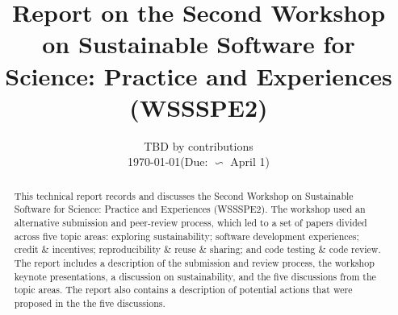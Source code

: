 \documentclass[11pt, oneside]{amsart}
\begin{document}
\title[]{Report on the Second Workshop on Sustainable Software for Science: Practice and Experiences (WSSSPE2)} 

\author{TBD by contributions \\{\scriptsize\today \quad  (Due:  $\backsim$ April 1)}}
%
%
%
%  
%
%
%
%
%
%
%


       
\begin{abstract}      
This technical report records and discusses the Second Workshop on Sustainable Software for
Science: Practice and Experiences (WSSSPE2).  The workshop used an alternative submission
and peer-review process, which led to a set of papers divided across five topic areas:
exploring sustainability;
software development experiences;
credit \& incentives;
reproducibility \& reuse \& sharing; and
code testing \& code review.
The report includes a description of the submission and review process, the workshop
keynote presentations,
a discussion on sustainability, and the five discussions from the topic areas.  The report also
contains a description of potential actions that were proposed in the the five discussions.
\end{abstract}
\end{document}
